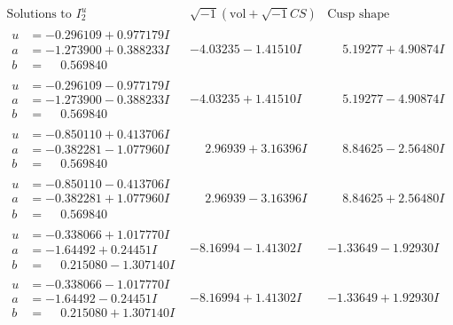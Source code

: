\documentclass[1p]{elsarticle_modified}
\theoremstyle{definition}
\newcommand{\I}{\sqrt{-1}}
\begin{document}
$$\begin{array}{c|c|c}  
\text{Solutions to }I^u_{2}& \I (\text{vol} + \sqrt{-1}CS) & \text{Cusp shape}\\
 \hline 
\begin{aligned}
u &= -0.296109 + 0.977179 I \\
a &= -1.273900 + 0.388233 I \\
b &= \phantom{-}0.569840\phantom{ +0.000000I}\end{aligned}
 & -4.03235 - 1.41510 I & \phantom{-}5.19277 + 4.90874 I \\ \hline\begin{aligned}
u &= -0.296109 - 0.977179 I \\
a &= -1.273900 - 0.388233 I \\
b &= \phantom{-}0.569840\phantom{ +0.000000I}\end{aligned}
 & -4.03235 + 1.41510 I & \phantom{-}5.19277 - 4.90874 I \\ \hline\begin{aligned}
u &= -0.850110 + 0.413706 I \\
a &= -0.382281 - 1.077960 I \\
b &= \phantom{-}0.569840\phantom{ +0.000000I}\end{aligned}
 & \phantom{-}2.96939 + 3.16396 I & \phantom{-}8.84625 - 2.56480 I \\ \hline\begin{aligned}
u &= -0.850110 - 0.413706 I \\
a &= -0.382281 + 1.077960 I \\
b &= \phantom{-}0.569840\phantom{ +0.000000I}\end{aligned}
 & \phantom{-}2.96939 - 3.16396 I & \phantom{-}8.84625 + 2.56480 I \\ \hline\begin{aligned}
u &= -0.338066 + 1.017770 I \\
a &= -1.64492 + 0.24451 I \\
b &= \phantom{-}0.215080 - 1.307140 I\end{aligned}
 & -8.16994 - 1.41302 I & -1.33649 - 1.92930 I \\ \hline\begin{aligned}
u &= -0.338066 - 1.017770 I \\
a &= -1.64492 - 0.24451 I \\
b &= \phantom{-}0.215080 + 1.307140 I\end{aligned}
 & -8.16994 + 1.41302 I & -1.33649 + 1.92930 I \\ \hline\begin{aligned}

\end{aligned}
\end{array}$$
\end{document}
